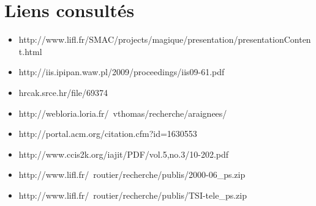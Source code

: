 \section{Liens consultés}

\begin{itemize}
  \item http://www.lifl.fr/SMAC/projects/magique/presentation/presentationContent.html
  \item http://iis.ipipan.waw.pl/2009/proceedings/iis09-61.pdf
  \item hrcak.srce.hr/file/69374
  \item http://webloria.loria.fr/~vthomas/recherche/araignees/

  \item http://portal.acm.org/citation.cfm?id=1630553
  \item http://www.ccis2k.org/iajit/PDF/vol.5,no.3/10-202.pdf
  \item http://www.lifl.fr/~routier/recherche/publis/2000-06\_ps.zip
  \item http://www.lifl.fr/~routier/recherche/publis/TSI-tele\_ps.zip
\end{itemize}


